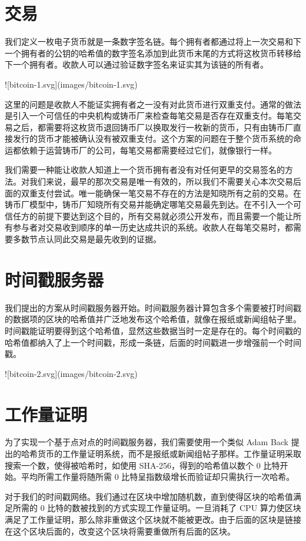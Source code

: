 \documentclass{article}
\begin{document}
\section{交易}
我们定义一枚电子货币就是一条数字签名链。每个拥有者都通过将上一次交易和下一个拥有者的公钥的哈希值的数字签名添加到此货币末尾的方式将这枚货币转移给下一个拥有者。收款人可以通过验证数字签名来证实其为该链的所有者。

![bitcoin-1.svg](images/bitcoin-1.svg)

这里的问题是收款人不能证实拥有者之一没有对此货币进行双重支付。通常的做法是引入一个可信任的中央机构或铸币厂来检查每笔交易是否存在双重支付。每笔交易之后，都需要将这枚货币退回铸币厂以换取发行一枚新的货币，只有由铸币厂直接发行的货币才能被确认没有被双重支付。这个方案的问题在于整个货币系统的命运都依赖于运营铸币厂的公司，每笔交易都需要经过它们，就像银行一样。

我们需要一种能让收款人知道上一个货币拥有者没有对任何更早的交易签名的方法。对我们来说，最早的那次交易是唯一有效的，所以我们不需要关心本次交易后面的双重支付尝试。唯一能确保一笔交易不存在的方法是知晓所有之前的交易。在铸币厂模型中，铸币厂知晓所有交易并能确定哪笔交易最先到达。在不引入一个可信任方的前提下要达到这个目的，所有交易就必须公开发布\cite{Dai}，而且需要一个能让所有参与者对交易收到顺序的单一历史达成共识的系统。收款人在每笔交易时，都需要多数节点认同此交易是最先收到的证据。

\section{时间戳服务器}
我们提出的方案从时间戳服务器开始。时间戳服务器计算包含多个需要被打时间戳的数据项的区块的哈希值并广泛地发布这个哈希值，就像在报纸或新闻组帖子里\cite{Massias,Haber,Bayer,Stornetta}。时间戳能证明要得到这个哈希值，显然这些数据当时一定是存在的。每个时间戳的哈希值都纳入了上一个时间戳，形成一条链，后面的时间戳进一步增强前一个时间戳。

![bitcoin-2.svg](images/bitcoin-2.svg)

\section{工作量证明}
为了实现一个基于点对点的时间戳服务器，我们需要使用一个类似 Adam Back 提出的哈希货币\cite{Back}的工作量证明系统，而不是报纸或新闻组帖子那样。工作量证明采取搜索一个数，使得被哈希时，如使用 SHA-256，得到的哈希值以数个 0 比特开始。平均所需工作量将随所需 0 比特呈指数级增长而验证却只需执行一次哈希。

对于我们的时间戳网络。我们通过在区块中增加随机数，直到使得区块的哈希值满足所需的 0 比特的数被找到的方式实现工作量证明。一旦消耗了 CPU 算力使区块满足了工作量证明，那么除非重做这个区块就不能被更改。由于后面的区块是链接在这个区块后面的，改变这个区块将需要重做所有后面的区块。
\end{document}
